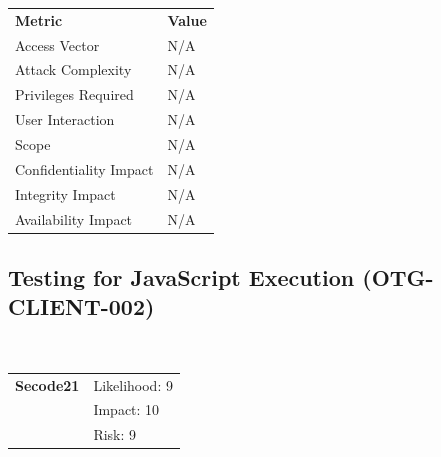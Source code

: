 \documentclass[headsepline,footsepline,footinclude=false,oneside,fontsize=11pt,paper=a4,listof=totoc,bibliography=totoc]{scrbook} %
\begin{document}
\begin{center}
	\begin{tabular}{ll}
		\rowcolor[HTML]{34CDF9}
		{\color[HTML]{ECF4FF} \textbf{Metric}}        & {\color[HTML]{ECF4FF} \textbf{Value}} \\
		\rowcolor[HTML]{BBDAFF}
		{\color[HTML]{333333} Access Vector}          & {\color[HTML]{333333} } N/A              \\
		\rowcolor[HTML]{ECF4FF}
		{\color[HTML]{333333} Attack Complexity}      & {\color[HTML]{333333} } N/A              \\
		\rowcolor[HTML]{BBDAFF}
		{\color[HTML]{333333} Privileges Required}    & {\color[HTML]{333333} } N/A              \\
		\rowcolor[HTML]{ECF4FF}
		{\color[HTML]{333333} User Interaction}       & {\color[HTML]{333333} } N/A              \\
		\rowcolor[HTML]{BBDAFF}
		{\color[HTML]{333333} Scope}                  & {\color[HTML]{333333} } N/A              \\
		\rowcolor[HTML]{ECF4FF}
		{\color[HTML]{333333} Confidentiality Impact} & {\color[HTML]{333333} } N/A              \\
		\rowcolor[HTML]{BBDAFF}
		{\color[HTML]{333333} Integrity Impact}       & {\color[HTML]{333333} } N/A              \\
		\rowcolor[HTML]{ECF4FF}
		{\color[HTML]{333333} Availability Impact}    & {\color[HTML]{333333} } N/A
	\end{tabular}
\end{center}

\pagebreak

\subsection{Testing for JavaScript Execution (OTG-CLIENT-002)}\
\begin{tabular}{cR{12cm}}
	\textbf{Secode21} & Likelihood: 9\\& Impact: 10\\& Risk: 9
\end{tabular}
\end{document}
